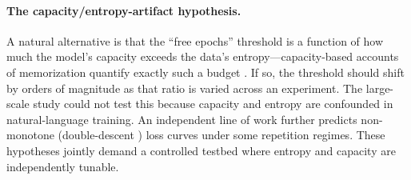 \documentclass[11pt]{article}
\begin{document}
\paragraph{The capacity/entropy-artifact hypothesis.}
A natural alternative is that the ``free epochs'' threshold is a function of
how much the model's capacity exceeds the data's entropy---capacity-based accounts of
memorization quantify exactly such a budget \citep{morris2025capacity}. If so, the threshold should shift
by orders of magnitude as that ratio is varied across an experiment. The large-scale study
\citep{muennighoff2023scaling} could not test this because capacity and entropy are
confounded in natural-language training. An independent line of work
\citep{hernandez2022repeateddata} further predicts non-monotone (double-descent
\citep{nakkiran2020double}) loss curves under some repetition regimes. These hypotheses
jointly demand a controlled testbed where entropy and capacity are independently tunable.
\end{document}
